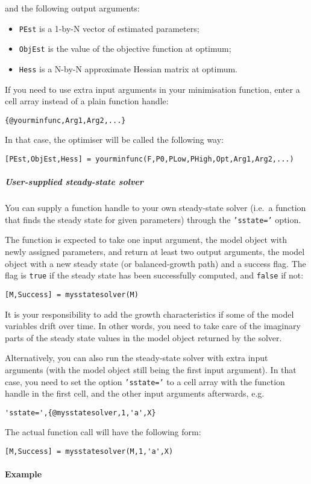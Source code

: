 and the following output arguments:

\begin{itemize}
\itemsep1pt\parskip0pt
\item
  \texttt{PEst} is a 1-by-N vector of estimated parameters;
\item
  \texttt{ObjEst} is the value of the objective function at optimum;
\item
  \texttt{Hess} is a N-by-N approximate Hessian matrix at optimum.
\end{itemize}

If you need to use extra input arguments in your minimisation function,
enter a cell array instead of a plain function handle:

\begin{verbatim}
{@yourminfunc,Arg1,Arg2,...}
\end{verbatim}

In that case, the optimiser will be called the following way:

\begin{verbatim}
[PEst,ObjEst,Hess] = yourminfunc(F,P0,PLow,PHigh,Opt,Arg1,Arg2,...)
\end{verbatim}

\subparagraph{User-supplied steady-state
solver}\label{user-supplied-steady-state-solver}

You can supply a function handle to your own steady-state solver (i.e.~a
function that finds the steady state for given parameters) through the
\texttt{'sstate='} option.

The function is expected to take one input argument, the model object
with newly assigned parameters, and return at least two output
arguments, the model object with a new steady state (or balanced-growth
path) and a success flag. The flag is \texttt{true} if the steady state
has been successfully computed, and \texttt{false} if not:

\begin{verbatim}
[M,Success] = mysstatesolver(M)
\end{verbatim}

It is your responsibility to add the growth characteristics if some of
the model variables drift over time. In other words, you need to take
care of the imaginary parts of the steady state values in the model
object returned by the solver.

Alternatively, you can also run the steady-state solver with extra input
arguments (with the model object still being the first input argument).
In that case, you need to set the option \texttt{'sstate='} to a cell
array with the function handle in the first cell, and the other input
arguments afterwards, e.g.

\begin{verbatim}
'sstate=',{@mysstatesolver,1,'a',X}
\end{verbatim}

The actual function call will have the following form:

\begin{verbatim}
[M,Success] = mysstatesolver(M,1,'a',X)
\end{verbatim}

\paragraph{Example}\label{example}


